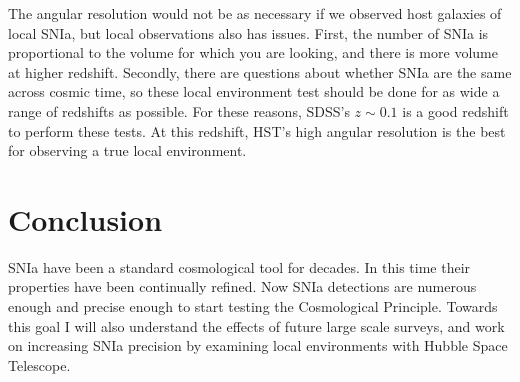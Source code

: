 \documentclass[apj, iop]{emulateapj}
\newcommand{\sn}{SNIa}
\begin{document}
The angular resolution would not be as necessary if we observed host galaxies of
local \sn{}, but local observations also has issues. First, the number of \sn{}
is proportional to the volume for which you are looking, and there is more
volume at higher redshift. Secondly, there are questions about whether \sn{} are
the same across cosmic time, so these local environment test should be done for
as wide a range of redshifts as possible. For these reasons, SDSS's $z \sim 0.1$
is a good redshift to perform these tests. At this redshift, HST's high angular
resolution is the best for observing a true local environment.

\section{Conclusion}

\sn{} have been a standard cosmological tool for decades. In this time their
properties have been continually refined. Now \sn{} detections are numerous
enough and  precise enough to start testing the Cosmological Principle. Towards
this goal I will also understand the effects of future large scale surveys, and
work on increasing \sn{} precision by examining local environments with Hubble
Space Telescope.



\end{document}
